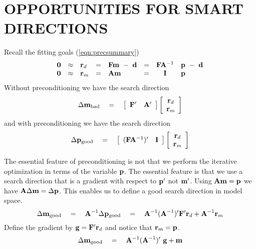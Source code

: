 \section{OPPORTUNITIES FOR SMART DIRECTIONS}
Recall the fitting goals (\ref{eqn:precsummary})
\begin{equation}
\begin{array}{llllllcl}
\bold 0 &\approx& \bold r_d &=&  \bold F \bold m \ -\  \bold d   &=&
    \bold F  \bold A^{-1} &\bold p  \ -\  \bold d
    \\
\bold 0 &\approx& \bold r_m &=&  \bold A \bold m       &=&
    \bold I        & \bold p
\end{array}
\label{eqn:precsummary}
\end{equation}
Without preconditioning we have the search direction
\begin{equation}
\Delta \bold m_{\rm bad} \quad =\quad
\left[
	\begin{array}{cc}
	\bold F' & \bold A'
	\end{array}
\right]
\left[
	\begin{array}{c}
	\bold r_d \\
	\bold r_m
	\end{array}
\right]
\end{equation}
and with preconditioning we have the search direction
\begin{equation}
\Delta \bold p_{\rm good} \quad =\quad
\left[
	\begin{array}{cc}
	(\bold F\bold A^{-1})' & \bold I
	\end{array}
\right]
\left[
	\begin{array}{c}
	\bold r_d \\
	\bold r_m
	\end{array}
\right]
\end{equation}
\par
The essential feature of preconditioning is not that we perform
the iterative optimization in terms of the variable $\bold p$.
The essential feature is that we use a search direction
that is a gradient with respect to $\bold p'$ not $\bold m'$.
Using $\bold A\bold m=\bold p$ we have
$\bold A\Delta \bold m=\Delta \bold p$.
This enables us to define a good search direction in model space.
\begin{equation}
\Delta \bold m_{\rm good} \quad =\quad \bold A^{-1}
\Delta \bold p_{\rm good} \quad =\quad
	\bold A^{-1} (\bold A^{-1})'
	\bold F' \bold r_d + \bold  A^{-1} \bold r_m
\end{equation}
Define the gradient by $\bold g=\bold F'\bold r_d$ and
notice that $\bold r_m=\bold p$.
\begin{equation}
\Delta \bold m_{\rm good} \quad =\quad
	\bold A^{-1} (\bold A^{-1})' \ \bold g
	+ \bold m
\label{eqn:newdirection}
\end{equation}

